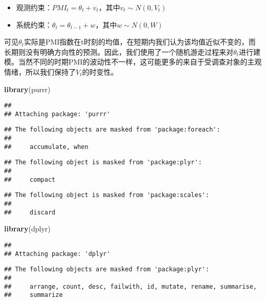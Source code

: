 \documentclass[]{ctexart}
\newenvironment{Shaded}{\begin{snugshade}}{\end{snugshade}}
\newcommand{\KeywordTok}[1]{\textcolor[rgb]{0.13,0.29,0.53}{\textbf{{#1}}}}
\newcommand{\NormalTok}[1]{{#1}}
\providecommand{\tightlist}{%
  \setlength{\itemsep}{0pt}\setlength{\parskip}{0pt}}
\begin{document}
\begin{itemize}
\tightlist
\item
  观测约束：\(PMI_t = \theta_t + v_t\)，其中\(v_t\sim N(0,V_t)\)
\item
  系统约束：\(\theta_t = \theta_{t-1} + w\)，其中\(w\sim N(0,W)\)
\end{itemize}

可见\(\theta_t\)实际是PMI指数在t时刻的均值，在短期内我们认为该均值近似不变的，而长期则没有明确方向性的预测。因此，我们使用了一个随机游走过程来对\(\theta_t\)进行建模。当然不同的时期PMI的波动性不一样，这可能更多的来自于受调查对象的主观情绪，所以我们保持了\(V_t\)的时变性。

\begin{Shaded}
\begin{Highlighting}[]
\KeywordTok{library}\NormalTok{(purrr)}
\end{Highlighting}
\end{Shaded}

\begin{verbatim}
## 
## Attaching package: 'purrr'
\end{verbatim}

\begin{verbatim}
## The following objects are masked from 'package:foreach':
## 
##     accumulate, when
\end{verbatim}

\begin{verbatim}
## The following object is masked from 'package:plyr':
## 
##     compact
\end{verbatim}

\begin{verbatim}
## The following object is masked from 'package:scales':
## 
##     discard
\end{verbatim}

\begin{Shaded}
\begin{Highlighting}[]
\KeywordTok{library}\NormalTok{(dplyr)}
\end{Highlighting}
\end{Shaded}

\begin{verbatim}
## 
## Attaching package: 'dplyr'
\end{verbatim}

\begin{verbatim}
## The following objects are masked from 'package:plyr':
## 
##     arrange, count, desc, failwith, id, mutate, rename, summarise,
##     summarize
\end{verbatim}
\end{document}
